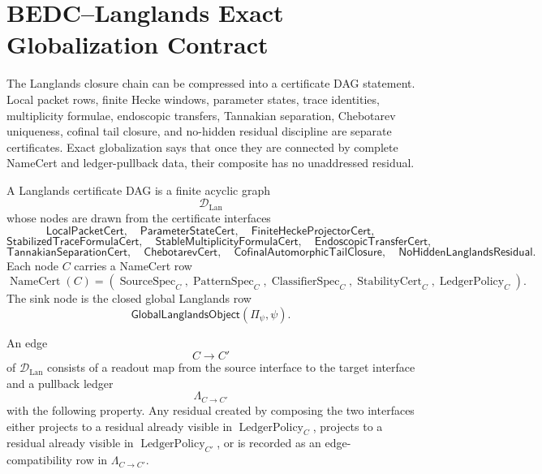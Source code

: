 \section{BEDC--Langlands Exact Globalization Contract}
\label{sec:unified-reality-bedc-langlands-exact-globalization-contract}

The Langlands closure chain can be compressed into a certificate DAG
statement. Local packet rows, finite Hecke windows, parameter states,
trace identities, multiplicity formulae, endoscopic transfers,
Tannakian separation, Chebotarev uniqueness, cofinal tail closure, and
no-hidden residual discipline are separate certificates. Exact
globalization says that once they are connected by complete NameCert
and ledger-pullback data, their composite has no unaddressed residual.

\begin{definition}
\label{def:unified-reality-langlands-certificate-dag}
A Langlands certificate DAG is a finite acyclic graph
$$
\mathcal D_{\mathrm{Lan}}
$$
whose nodes are drawn from the certificate interfaces
$$
\mathsf{LocalPacketCert},\quad
\mathsf{ParameterStateCert},\quad
\mathsf{FiniteHeckeProjectorCert},
$$
$$
\mathsf{StabilizedTraceFormulaCert},\quad
\mathsf{StableMultiplicityFormulaCert},\quad
\mathsf{EndoscopicTransferCert},
$$
$$
\mathsf{TannakianSeparationCert},\quad
\mathsf{ChebotarevCert},\quad
\mathsf{CofinalAutomorphicTailClosure},\quad
\mathsf{NoHiddenLanglandsResidual}.
$$
Each node $C$ carries a NameCert row
$$
\operatorname{NameCert}(C)
=
(\operatorname{SourceSpec}_C,
\operatorname{PatternSpec}_C,
\operatorname{ClassifierSpec}_C,
\operatorname{StabilityCert}_C,
\operatorname{LedgerPolicy}_C).
$$
The sink node is the closed global Langlands row
$$
\mathsf{GlobalLanglandsObject}(\Pi_\psi,\psi).
$$
\end{definition}

\begin{definition}
\label{def:unified-reality-langlands-ledger-pullback-edge}
An edge
$$
C\longrightarrow C'
$$
of $\mathcal D_{\mathrm{Lan}}$ consists of a readout map from the
source interface to the target interface and a pullback ledger
$$
\Lambda_{C\to C'}
$$
with the following property. Any residual created by composing the two
interfaces either projects to a residual already visible in
$\operatorname{LedgerPolicy}_C$, projects to a residual already visible
in $\operatorname{LedgerPolicy}_{C'}$, or is recorded as an
edge-compatibility row in $\Lambda_{C\to C'}$.
\end{definition}

